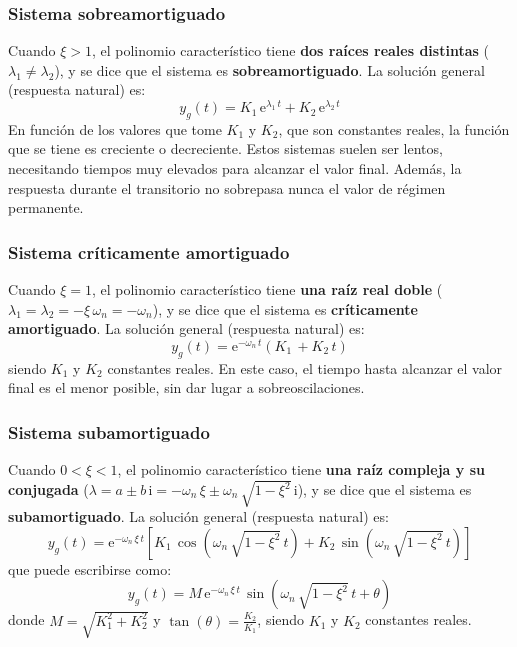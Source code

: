 \documentclass[11pt]{book} %
\begin{document}
	\subsubsection{Sistema sobreamortiguado}
	Cuando $\xi>1$, el polinomio característico tiene \textbf{dos raíces reales distintas} ($\lambda_1\neq\lambda_2$), y se dice que el sistema es \textbf{sobreamortiguado}. La solución general (respuesta natural) es:
	\begin{equation*}
	 y_g(t)=K_1\,\mathrm{e}^{\lambda_1\,t}+K_2\,\mathrm{e}^{\lambda_2\,t}   
	\end{equation*}
	En función de los valores que tome $K_1$ y $K_2$, que son constantes reales, la función que se tiene es creciente o decreciente. Estos sistemas suelen ser lentos, necesitando tiempos muy elevados para alcanzar el valor final. Además, la respuesta durante el transitorio no sobrepasa nunca el valor de régimen permanente. 
	
	\subsubsection{Sistema críticamente amortiguado}
	Cuando $\xi=1$, el polinomio característico tiene \textbf{una raíz real doble} ($\lambda_1=\lambda_2=-\xi\,\omega_n=-\omega_n$), y se dice que el sistema es \textbf{críticamente amortiguado}. La solución general (respuesta natural) es:
	\begin{equation*}
	 y_g(t)=\mathrm{e}^{-\omega_n\,t}(K_1\,+K_2\,t)   
	\end{equation*}
	siendo $K_1$ y $K_2$ constantes reales. En este caso, el tiempo hasta alcanzar el valor final es el menor posible, sin dar lugar a sobreoscilaciones. 
	
	\subsubsection{Sistema subamortiguado}\label{sec.subamortiguado}
	Cuando $0<\xi<1$, el polinomio característico tiene \textbf{una raíz compleja y su conjugada} ($\lambda=a\pm b\,\mathrm{i}=-\omega_n\,\xi\pm \omega_n\,\sqrt{1-\xi^2}\,\mathrm{i}$), y se dice que el sistema es \textbf{subamortiguado}. La solución general (respuesta natural) es:
	\begin{equation*}
	 y_g(t)=\mathrm{e}^{-\omega_n\,\xi \,t}\left[K_1\,\cos(\omega_n\,\sqrt{1-\xi^2}\,t)+K_2\,\sin(\omega_n\,\sqrt{1-\xi^2}\,t) \right]  
	\end{equation*}
	que puede escribirse como: 
	\begin{equation*}
	 y_g(t)=M\,\mathrm{e}^{-\omega_n\,\xi \,t}\,\sin\left(\omega_n\,\sqrt{1-\xi^2}\,t + \theta \right)
	\end{equation*}
	donde $M=\sqrt{K_1^2+K_2^2}$ y $\tan(\theta)=\frac{K_2}{K_1}$, siendo $K_1$ y $K_2$ constantes reales.
	
\end{document}
